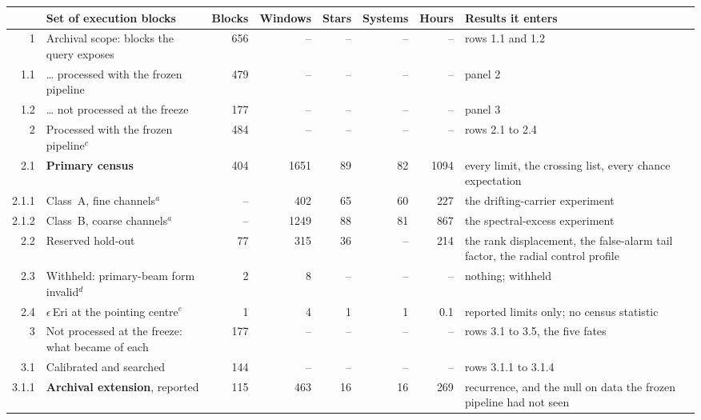 \begin{tabular}{@{}r@{~}p{}rrrrrp{}@{}}
\hline
 & Set of execution blocks & Blocks & Windows & Stars & Systems & Hours & Results it enters \\
\hline
1 & Archival scope: blocks the query exposes & 656 & -- & -- & -- & -- & rows 1.1 and 1.2 \\
1.1 & \hspace{0.8em}\ldots{} processed with the frozen pipeline & 479 & -- & -- & -- & -- & panel 2 \\
1.2 & \hspace{0.8em}\ldots{} not processed at the freeze & 177 & -- & -- & -- & -- & panel 3 \\
\hline
2 & Processed with the frozen pipeline$^{c}$ & 484 & -- & -- & -- & -- & rows 2.1 to 2.4 \\
2.1 & \hspace{0.8em}\textbf{Primary census} & 404 & 1651 & 89 & 82 & 1094 & every limit, the crossing list, every chance expectation \\
2.1.1 & \hspace{1.6em}Class~A, fine channels$^{a}$ & -- & 402 & 65 & 60 & 227 & the drifting-carrier experiment \\
2.1.2 & \hspace{1.6em}Class~B, coarse channels$^{a}$ & -- & 1249 & 88 & 81 & 867 & the spectral-excess experiment \\
2.2 & \hspace{0.8em}Reserved hold-out & 77 & 315 & 36 & -- & 214 & the rank displacement, the false-alarm tail factor, the radial control profile \\
2.3 & \hspace{0.8em}Withheld: primary-beam form invalid$^{d}$ & 2 & 8 & -- & -- & -- & nothing; withheld \\
2.4 & \hspace{0.8em}$\epsilon$\,Eri at the pointing centre$^{e}$ & 1 & 4 & 1 & 1 & 0.1 & reported limits only; no census statistic \\
\hline
3 & Not processed at the freeze: what became of each & 177 & -- & -- & -- & -- & rows 3.1 to 3.5, the five fates \\
3.1 & \hspace{0.8em}Calibrated and searched & 144 & -- & -- & -- & -- & rows 3.1.1 to 3.1.4 \\
3.1.1 & \hspace{1.6em}\textbf{Archival extension}, reported & 115 & 463 & 16 & 16 & 269 & recurrence, and the null on data the frozen pipeline had not seen \\

\end{tabular}
